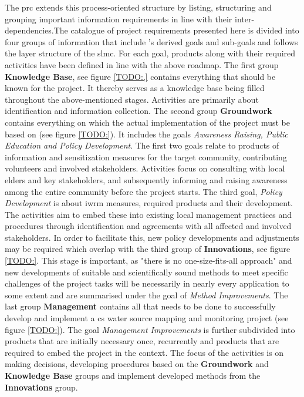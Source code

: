 The \acrfull{prc} extends this process-oriented structure by listing, structuring and grouping important information requirements in line with their inter-dependencies.The catalogue of project requirements presented here is divided into four groups of information that include \autocite{minkmanCitizenScienceWater2015}'s derived goals and sub-goals and follows the layer structure of the \acrshort{slmc}. For each goal, products along with their required activities have been defined in line with the above roadmap.\newline
The first group \textbf{Knowledge Base}, see figure \ref{TODO:,} contains everything that should be known for the project. It thereby serves as a knowledge base being filled throughout the above-mentioned stages. Activities are primarily about identification and information collection. The second group \textbf{Groundwork} contains everything on which the actual implementation of the project must be based on (see figure \ref{TODO:}). It includes the goals \textit{Awareness Raising, Public Education and Policy Development}. The first two goals relate to products of information and sensitization measures for the target community, contributing volunteers and involved stakeholders. Activities focus on consulting with local elders and key stakeholders, and subsequently informing and raising awareness among the entire community before the project starts. The third goal, \textit{Policy Development} is about \acrshort{iwrm} measures, required products and their development. The activities aim to embed these into existing local management practices and procedures through identification and agreements with all affected and involved stakeholders. In order to facilitate this, new policy developments and adjustments may be required which overlap with the third group of \textbf{Innovations}, see figure \ref{TODO:}. This stage is important, as "there is no one-size-fits-all approach" \autocite[2]{fraislCitizenScienceEnvironmental2022} and new developments of suitable and scientifically sound methods to meet specific challenges of the project tasks will be necessarily in nearly every application to some extent and are summarised under the goal of \textit{Method Improvements}. The last group \textbf{Management} contains all that needs to be done to successfully develop and implement a \acrshort{cs} water source mapping and monitoring project (see figure \ref{TODO:}). The goal \textit{Management Improvements} is further subdivided into products that are initially necessary once, recurrently and products that are required to embed the project in the context. The focus of the activities is on making decisions, developing procedures based on the \textbf{Groundwork} and \textbf{Knowledge Base} groups and implement developed methods from the \textbf{Innovations} group.\newline
